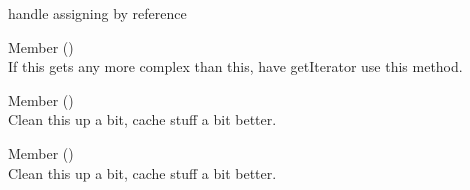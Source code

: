 \begin{DoxyRefList}
\label{todo__todo000022}%
%
handle assigning by reference  
\item[Member \doxylink{class_whoops_1_1_exception_1_1_frame_collection_a3123a073c643530533ae6668b283b35c}{Whoops\textbackslash{}Exception\textbackslash{}Frame\+Collection\+::get\+Array} ()]\hfill \\
\label{todo__todo000005}%
%
If this gets any more complex than this, have get\+Iterator use this method.  
\item[Member \doxylink{class_whoops_1_1_exception_1_1_inspector_a898512b592424c32df6c385217b110ea}{Whoops\textbackslash{}Exception\textbackslash{}Inspector\+::get\+Previous\+Exception\+Inspector} ()]\hfill \\
\label{todo__todo000006}%
%
Clean this up a bit, cache stuff a bit better.  
\item[Member \doxylink{interface_whoops_1_1_inspector_1_1_inspector_interface_a75ca05c10e99c5562384bfbdfcd42ce0}{Whoops\textbackslash{}Inspector\textbackslash{}Inspector\+Interface\+::get\+Previous\+Exception\+Inspector} ()]\hfill \\
\label{todo__todo000007}%
%
Clean this up a bit, cache stuff a bit better. 
\end{DoxyRefList}